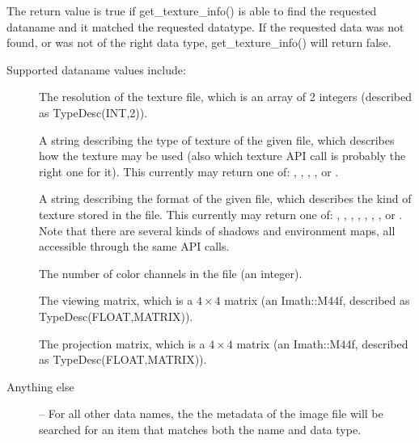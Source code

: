 The return value is {\cf true} if {\cf get_texture_info()} is able
to find the requested {\cf dataname} and it matched the requested
{\cf datatype}.  If the requested data was not found, or was not
of the right data type, {\cf get_texture_info()} will return {\cf false}.

Supported {\cf dataname} values include:

\begin{description}
\item[\spc] \spc
\vspace{-12pt} \item[\rm {}] The resolution of the texture file, which
is an array of 2 integers (described as {\cf TypeDesc(INT,2)}).

\item[\rm {}] A string describing the type of texture
of the given file, which describes how the texture may be used (also
which texture API call is probably the right one for it).
This currently may return one of: , ,
, , 
or .

\item[\rm {}] A string describing the format of the
given file, which describes the kind of texture stored in the file.
This currently may return one of: , ,
, , , , , or .
Note that there are several kinds of shadows and environment maps,
all accessible through the same API calls.

\item[\rm {}] The number of color channels in the file 
(an integer).

\item[\rm {}] The viewing matrix, which is a
$4 \times 4$ matrix (an {\cf Imath::M44f}, described as {\cf
  TypeDesc(FLOAT,MATRIX)}).

\item[\rm {}] The projection matrix, which is a
$4 \times 4$ matrix (an {\cf Imath::M44f}, described as {\cf
  TypeDesc(FLOAT,MATRIX)}).

\item[Anything else] -- For all other data names, the
the metadata of the image file will be searched for an item that
matches both the name and data type.

\end{description}
\apiend


